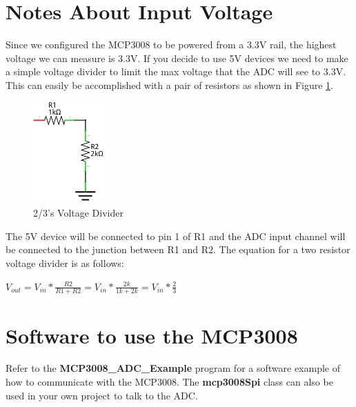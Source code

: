 \documentclass{article}
\begin{document}
\section{Notes About Input Voltage}

Since we configured the MCP3008 to be powered from a 3.3V rail, the highest voltage we can measure is 3.3V. If you decide to use 5V devices we need to make a simple voltage divider to limit the max voltage that the ADC will see to 3.3V. This can easily be accomplished with a pair of resistors as shown in Figure \ref{Voltage_Divider}.

 
	\begin{figure}[H]
		\centering
		\includegraphics[width=0.25\textwidth]{pics/Voltage_Divider.png}
		\caption{2/3's Voltage Divider}
		\label{Voltage_Divider}
	\end{figure}

The 5V device will be connected to pin 1 of R1 and the ADC input channel will be connected to the junction between R1 and R2. The equation for a two resistor voltage divider is as follows:

	\begin{center}
		\begin{math}
		V_{out} = V_{in} * \frac{R2}{R1 + R2} = V_{in} * \frac{2k}{1k + 2k} = V_{in} * \frac{2}{3}
		\end{math}
	\end{center}


\section{Software to use the MCP3008}

Refer to the \textbf{MCP3008\_ADC\_Example} program for a software example of how to communicate with the MCP3008. The \textbf{mcp3008Spi} class can also be used in your own project to talk to the ADC.
\end{document}
